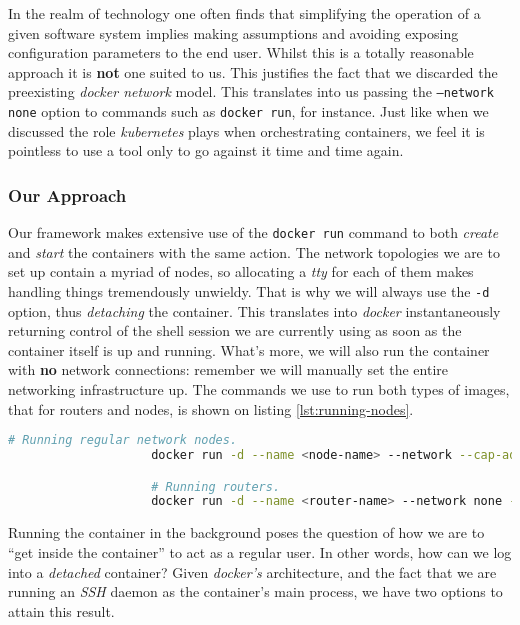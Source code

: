                 In the realm of technology one often finds that simplifying the operation of a given software system implies making assumptions and avoiding exposing configuration parameters to the end user. Whilst this is a totally reasonable approach it is \textbf{not} one suited to us. This justifies the fact that we discarded the preexisting \textit{docker network} model. This translates into us passing the \texttt{--network none} option to commands such as \texttt{docker run}, for instance. Just like when we discussed the role \textit{kubernetes} plays when orchestrating containers, we feel it is pointless to use a tool only to go against it time and time again.\\

            \subsubsection{Our Approach}
                Our framework makes extensive use of the \texttt{docker run} command to both \textit{create} and \textit{start} the containers with the same action. The network topologies we are to set up contain a myriad of nodes, so allocating a \textit{tty} for each of them makes handling things tremendously unwieldy. That is why we will always use the \texttt{-d} option, thus \textit{detaching} the container. This translates into \textit{docker} instantaneously returning control of the shell session we are currently using as soon as the container itself is up and running. What's more, we will also run the container with \textbf{no} network connections: remember we will manually set the entire networking infrastructure up. The commands we use to run both types of images, that for routers and nodes, is shown on listing \ref{lst:running-nodes}.\\

                \begin{lstlisting}[language = bash, caption = Running Network Nodes., label = lst:running-nodes]
                    # Running regular network nodes.
                    docker run -d --name <node-name> --network --cap-add SYS_ADMIN none ubuntu_node

                    # Running routers.
                    docker run -d --name <router-name> --network none --cap-add SYS_ADMIN --cap-add NET_ADMIN --sysctl net.ipv4.ip_forward=1 ubuntu_router
                \end{lstlisting}

                Running the container in the background poses the question of how we are to ``get inside the container'' to act as a regular user. In other words, how can we log into a \textit{detached} container? Given \textit{docker's} architecture, and the fact that we are running an \textit{SSH} daemon as the container's main process, we have two options to attain this result.\\

